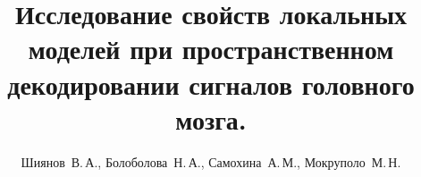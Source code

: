 \documentclass[12pt,twoside]{article}
\title
    [Локальные модели при декодировании сигналов головного мозга]
    {Исследование свойств локальных моделей при пространственном декодировании сигналов головного мозга.}
\author
    [Шиянов~В.\,А.]
    {Шиянов~В.\,А., Болоболова~Н.\,А., Самохина~А.\,М., Мокруполо~М.\,Н.}
\begin{document}
\maketitle
\bigskip
\bigskip
\bigskip
\bigskip
\bigskip
\maketitleSecondary
\end{document}
